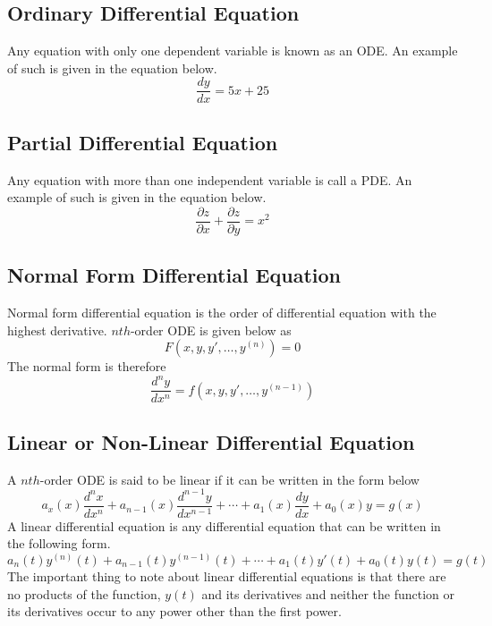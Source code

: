 \documentclass[12pt]{report}
\newcommand{\sps}{\\[0.2cm]}
\newcommand{\sprime}{'}
\begin{document}
	\subsection{Ordinary Differential Equation}
	Any equation with only one dependent variable is known as an ODE. An example of such is given in the equation below.
	\begin{equation}
		\frac{dy}{dx} = 5x + 25 \label{eq:1_2}
	\end{equation}
	
	\subsection{Partial Differential Equation}
	Any equation with more than one independent variable is call a PDE. An example of such is given in the equation below.
	\begin{equation}
		\frac{\partial z}{\partial x} + \frac{\partial z}{\partial y} = x^2 \label{eq:1_3}
	\end{equation}
	
	\subsection{Normal Form Differential Equation}
	Normal form differential equation is the order of differential equation with the highest derivative. $nth$-order ODE is given below as
	\begin{equation*}
		F(x,y,y\sprime,\ldots,y^{(n)}) = 0
	\end{equation*}
	The normal form is therefore
	\begin{equation}
			\frac{d^ny}{dx^n}=f(x,y,y\sprime,\ldots,y^{(n-1)}) \label{eq:1_4}
	\end{equation}
	
	\subsection{Linear or Non-Linear Differential Equation}
	A $nth$-order ODE is said to be linear if it can be written in the form below
	\begin{equation}
		a_x(x)\frac{d^nx}{dx^n} + a_{n-1}(x)\frac{d^{n-1}y}{dx^{n-1}} + \cdots + a_1(x)\frac{dy}{dx} + a_0(x)y = g(x) \label{eq:1_5}
	\end{equation}
	A linear differential equation is any differential equation that can be written in the following form.
	\begin{equation*}
		a_n(t)y^{(n)}(t) + a_{n-1}(t)y^{(n-1)}(t) + \cdots + a_1(t)y\sprime(t) + a_0(t)y(t) = g(t)
	\end{equation*}
	The important thing to note about linear differential equations is that there are no products of the function, $y(t)$ and its derivatives and neither the function or its derivatives occur to any
	power other than the first power.\sps
	
\end{document}
